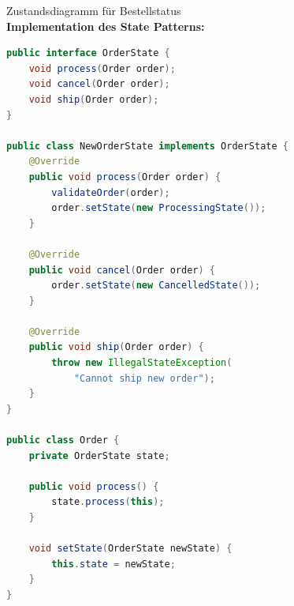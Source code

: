 \begin{example2}{Zustandsdiagramm für Bestellstatus}\\
\textbf{Implementation des State Patterns:}

\begin{lstlisting}[language=Java, style=basesmol]
public interface OrderState {
    void process(Order order);
    void cancel(Order order);
    void ship(Order order);
}

public class NewOrderState implements OrderState {
    @Override
    public void process(Order order) {
        validateOrder(order);
        order.setState(new ProcessingState());
    }
    
    @Override
    public void cancel(Order order) {
        order.setState(new CancelledState());
    }
    
    @Override
    public void ship(Order order) {
        throw new IllegalStateException(
            "Cannot ship new order");
    }
}

public class Order {
    private OrderState state;
    
    public void process() {
        state.process(this);
    }
    
    void setState(OrderState newState) {
        this.state = newState;
    }
}
\end{lstlisting}
\end{example2}

